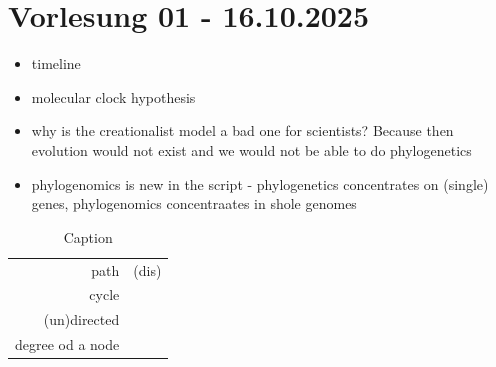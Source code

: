
\chapter{Vorlesung 01 - 16.10.2025}
\begin{itemize}
    \item timeline
    \item molecular clock hypothesis
    \item why is the creationalist model a bad one for scientists? Because then evolution would not exist and we would not be able to do phylogenetics
    \item phylogenomics is new in the script - phylogenetics concentrates on (single) genes, phylogenomics concentraates in shole genomes 
\end{itemize}
\begin{table}[H]
    \centering
    \begin{tabular}{r|r}
    path  & (dis)  \\
    cycle & \\
    (un)directed & \\
    degree od a node & 
    \end{tabular}
    \caption{Caption}
    \label{tab:my_label}
\end{table}
